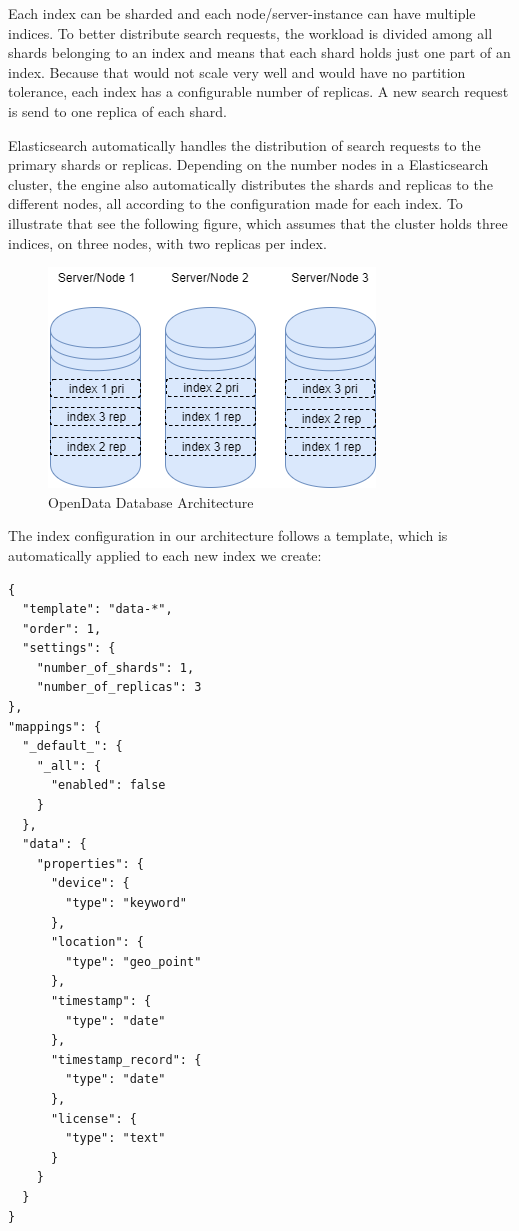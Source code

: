 Each index can be sharded and each node/server-instance can have
multiple indices. To better distribute search requests, the workload is
divided among all shards belonging to an index and means that each shard
holds just one part of an index. Because that would not scale very well
and would have no partition tolerance, each index has a configurable
number of replicas. A new search request is send to one replica of each
shard.

Elasticsearch automatically handles the distribution of search requests
to the primary shards or replicas. Depending on the number nodes in a
Elasticsearch cluster, the engine also automatically distributes the
shards and replicas to the different nodes, all according to the
configuration made for each index. To illustrate that see the following
figure, which assumes that the cluster holds three indices, on three
nodes, with two replicas per index.

\begin{figure}[htbp]
	\centering
	\includegraphics[scale=0.6]{images/07_database_architecture_elastic.png}
	\caption{OpenData Database Architecture}
	\label{fig:elastic-architecture}
\end{figure}

The index configuration in our architecture follows a template, which is
automatically applied to each new index we create:

\begin{verbatim}
{
  "template": "data-*",
  "order": 1,
  "settings": {
    "number_of_shards": 1,
    "number_of_replicas": 3
},
"mappings": {
  "_default_": {
    "_all": {
      "enabled": false
    }
  },
  "data": {
    "properties": {
      "device": {
        "type": "keyword"
      },
      "location": {
        "type": "geo_point"
      },
      "timestamp": {
        "type": "date"
      },
      "timestamp_record": {
        "type": "date"
      },
      "license": {
        "type": "text"
      }
    }
  }
}
\end{verbatim}

